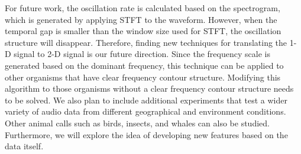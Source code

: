 For future work, the oscillation rate is calculated based on the spectrogram, which is generated by applying STFT to the waveform. However, when the temporal gap is smaller than the window size used for STFT, the oscillation structure will disappear. Therefore, finding new techniques for translating the 1-D signal to 2-D signal is our future direction. Since the frequency scale is generated based on the dominant frequency, this technique can be applied to other organisms that have clear frequency contour structure. Modifying this algorithm to those organisms without a clear frequency contour structure needs to be solved. 
We also plan to include additional experiments that test a wider variety of audio data from different geographical and environment conditions. Other animal calls such as birds, insects, and whales can also be studied. Furthermore, we will explore the idea of developing new features based on the data itself.


